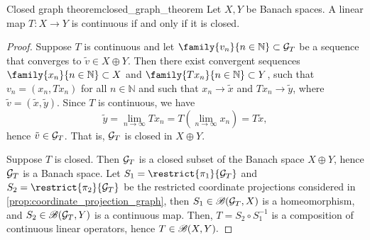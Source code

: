 \begin{theorem}{Closed graph theorem}{closed_graph_theorem}
    Let \(X, Y\) be Banach spaces. A linear map \(T : X \to Y\) is continuous if and only if it is closed.
\end{theorem}
\begin{proof}
    Suppose \(T\) is continuous and let \(\family{v_n}{n \in \mathbb{N}}\subset \graph{T}\) be a sequence that converges to \(\tilde{v} \in X \oplus Y\). Then there exist convergent sequences \(\family{x_n}{n \in \mathbb{N}} \subset X\) and \(\family{Tx_n}{n \in \mathbb{N}} \subset Y\), such that \(v_n = (x_n, Tx_n)\) for all \(n \in \mathbb{N}\) and such that \(x_n \to \tilde{x}\) and \(Tx_n \to \tilde{y}\), where \(\tilde{v} = (\tilde{x}, \tilde{y})\). Since \(T\) is continuous, we have
    \begin{equation*}
        \tilde{y} = \lim_{n\to\infty} Tx_n = T\left(\lim_{n\to\infty} x_n\right)= T\tilde{x},
    \end{equation*}
    hence \(\tilde{v} \in \mathcal{G}_{T}\). That is, \(\mathcal{G}_{T}\) is closed in \(X \oplus Y\).

    Suppose \(T\) is closed. Then \(\mathcal{G}_{T}\) is a closed subset of the Banach space \(X \oplus Y\), hence \(\mathcal{G}_{T}\) is a Banach space. Let \(S_1 = \restrict{\pi_1}{\graph{T}}\) and \(S_2 = \restrict{\pi_2}{\graph{T}}\) be the restricted coordinate projections considered in \cref{prop:coordinate_projection_graph}, then \(S_1 \in \mathscr{B}(\mathcal{G}_{T}, X)\) is a homeomorphism, and \(S_2 \in \mathscr{B}(\mathcal{G}_{T}, Y)\) is a continuous map. Then, \(T = S_2 \circ S_1^{-1}\) is a composition of continuous linear operators, hence \(T \in \mathscr{B}(X, Y).\)
\end{proof}
